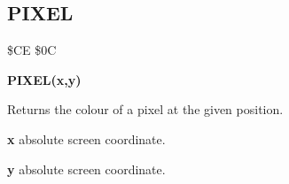 
\newpage
\subsection{PIXEL}
\begin{description}[leftmargin=2cm,style=nextline]
\item [Token:] \$CE \$0C
\item [Format:] {\bf PIXEL(x,y)}
\item [Usage:]  Returns the colour of a pixel at the given position.

               {\bf x} absolute screen coordinate.

               {\bf y} absolute screen coordinate.
\end{description}



\newpage
